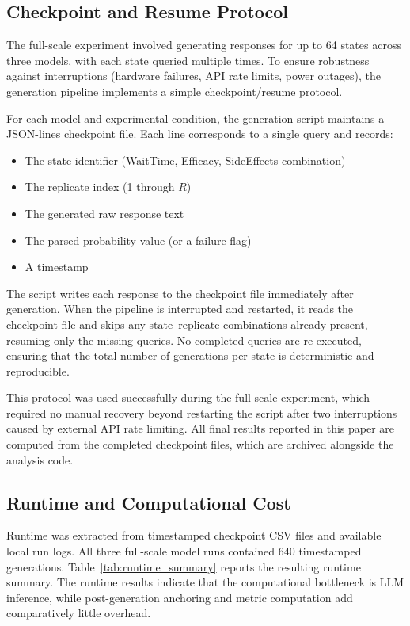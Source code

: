 \documentclass[11pt]{article}
\begin{document}
\subsection{Checkpoint and Resume Protocol}
\label{app:checkpoint}

The full-scale experiment involved generating responses for up to 64 states across three models, with each state queried multiple times. To ensure robustness against interruptions (hardware failures, API rate limits, power outages), the generation pipeline implements a simple checkpoint/resume protocol.

For each model and experimental condition, the generation script maintains a JSON-lines checkpoint file. Each line corresponds to a single query and records:

\begin{itemize}
    \item The state identifier (WaitTime, Efficacy, SideEffects combination)
    \item The replicate index (1 through $R$)
    \item The generated raw response text
    \item The parsed probability value (or a failure flag)
    \item A timestamp
\end{itemize}

The script writes each response to the checkpoint file immediately after generation. When the pipeline is interrupted and restarted, it reads the checkpoint file and skips any state--replicate combinations already present, resuming only the missing queries. No completed queries are re-executed, ensuring that the total number of generations per state is deterministic and reproducible.

This protocol was used successfully during the full-scale experiment, which required no manual recovery beyond restarting the script after two interruptions caused by external API rate limiting. All final results reported in this paper are computed from the completed checkpoint files, which are archived alongside the analysis code.

\subsection{Runtime and Computational Cost}
\label{app:runtime}

Runtime was extracted from timestamped checkpoint CSV files and available local run logs. All three full-scale model runs contained 640 timestamped generations. Table~\ref{tab:runtime_summary} reports the resulting runtime summary. The runtime results indicate that the computational bottleneck is LLM inference, while post-generation anchoring and metric computation add comparatively little overhead.
\end{document}

